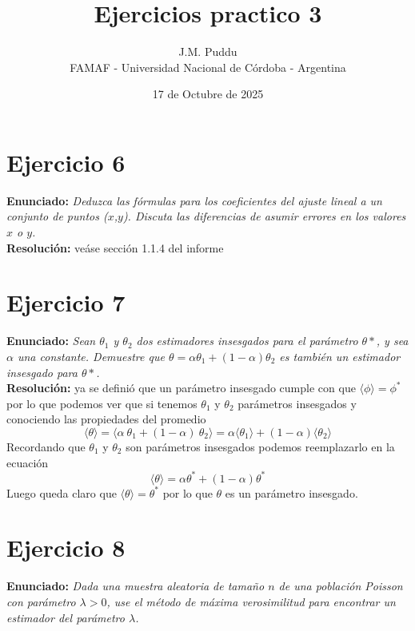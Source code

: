 \documentclass[twocolumn]{article}
\title{Ejercicios practico 3}
\author{J.M. Puddu \\ FAMAF - Universidad Nacional de Córdoba - Argentina}
\date{17 de Octubre de 2025}
\begin{document}
\twocolumn[
\begin{@twocolumnfalse}
    \maketitle
    \vspace{2em} %
\end{@twocolumnfalse}
]

\section{Ejercicio 6}
\textbf{Enunciado:}
\textit{Deduzca las fórmulas para los coeficientes del ajuste lineal a un conjunto de puntos ($x$,$y$). Discuta las diferencias de asumir errores en los valores $x$ o $y$. }\\

\textbf{Resolución:} veáse sección 1.1.4 del informe  

\section{Ejercicio 7}
\textbf{Enunciado:}
\textit{Sean $\theta_1$ y $\theta_2$ dos estimadores insesgados para el parámetro $\theta*$, y sea $\alpha$ una constante. Demuestre que
$\theta=\alpha\theta_1+(1-\alpha)\theta_2$ es también un estimador insesgado para $\theta*$.}\\

\textbf{Resolución:} ya se definió que un parámetro insesgado cumple con que $\langle\phi\rangle= \phi^*$ por lo que podemos ver que si tenemos $\theta_1$ y $\theta_2$ parámetros insesgados y conociendo las propiedades del promedio
\[
\langle\theta\rangle= \langle\alpha\: \theta_1 + (1-\alpha)\: \theta_2\rangle = \alpha \langle\theta_1\rangle + (1-\alpha)\langle\theta_2\rangle
\]
Recordando que $\theta_1$ y $  \theta_2$ son parámetros insesgados podemos reemplazarlo en la ecuación 
\[
\langle\theta\rangle= \alpha  \theta^* +(1-\alpha)\theta^*
\]
Luego queda claro que $\langle\theta\rangle=\theta^*$ por lo que $\theta$ es un parámetro insesgado.

\section{Ejercicio 8}
\textbf{Enunciado:}
\textit{Dada una muestra aleatoria de tamaño $n$ de una población Poisson con parámetro $\lambda>0$, use el método de máxima verosimilitud para encontrar un estimador del parámetro $\lambda$.}\\
\end{document}
